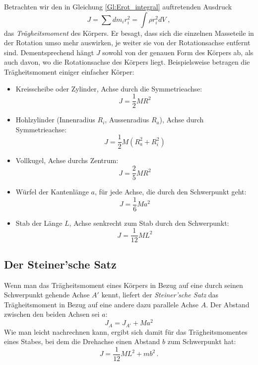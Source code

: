 Betrachten wir den in Gleichung \ref{Gl:Erot_integral} auftretenden Ausdruck
\begin{equation}
\label{Gl:Traegheitsmoment}
J = \sum{dm_i r_i^2} = \int{\rho r_i^2 dV} \; ,
\end{equation}
das \textit{Trägheitsmoment} des Körpers. Er besagt, dass sich die einzelnen Masseteile in der Rotation umso mehr auswirken, je weiter sie von der Rotationsachse entfernt sind. Dementsprechend hängt $J$ sowohl von der genauen Form des Körpers ab, als auch davon, wo die Rotationsachse des Körpers liegt. Beispielsweise betragen die Trägheitsmoment einiger einfacher Körper:
\begin{itemize}
\item Kreisscheibe oder Zylinder, Achse durch die Symmetrieachse:
	\begin{equation} \label{eq:J_Zylinder}
	J = \frac{1}{2} MR^2
	\end{equation}
\item Hohlzylinder (Innenradius $R_i$, Aussenradius $R_a$), Achse durch Symmetrieachse:
	\begin{equation}
	J = \frac{1}{2} M(R_a^2 + R_i^2)
	\end{equation}
\item Vollkugel, Achse durchs Zentrum:
	\begin{equation}
	J = \frac{2}{5} MR^2
	\end{equation}
\item Würfel der Kantenlänge $a$, für jede Achse, die durch den Schwerpunkt geht:
	\begin{equation}
	J = \frac{1}{6} Ma^2
	\end{equation}
\item Stab der Länge $L$, Achse senkrecht zum Stab durch den Schwerpunkt:
	\begin{equation}
	J = \frac{1}{12} ML^2
	\end{equation}
\end{itemize}

\subsection{Der Steiner'sche Satz}

Wenn man das Trägheitsmoment eines Körpers in Bezug auf eine durch seinen Schwerpunkt gehende Achse $A'$ kennt, liefert der \textit{Steiner'sche Satz} das Trägheitsmoment in Bezug auf eine andere dazu parallele Achse $A$. Der Abstand zwischen den beiden Achsen sei $a$:
\begin{equation}
\label{Gl:Steiner}
J_A = J_{A'} + Ma^2
\end{equation}
%
Wie man leicht nachrechnen kann, ergibt sich damit für das Trägheitsmomentes eines Stabes, bei dem die Drehachse einen Abstand $b$ zum Schwerpunkt hat:
\begin{equation} \label{eq:J_Stab-Steiner}
J = \frac{1}{12}ML^2 + mb^2 \, .
\end{equation}

